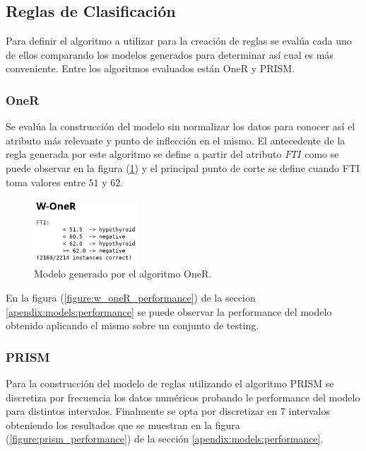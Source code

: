 \documentclass[osajnl,twocolumn,showpacs,superscriptaddress,10pt,floatfix]{revtex4-1} %
\begin{document}
\subsection{Reglas de Clasificación}

Para definir el algoritmo a utilizar para la creación de reglas se evalúa cada uno de ellos comparando los modelos generados para determinar así cual es más conveniente. Entre los algoritmos evaluados están OneR y PRISM. \\

\subsubsection{OneR}

Se evalúa la construcción del modelo sin normalizar los datos para conocer así el atributo más relevante y punto de inflección en el mismo. El antecedente de la regla generada por este algoritmo se define a partir del atributo $FTI$ como se puede observar en la figura (\ref{figure:w_oneR}) y el principal punto de corte se define cuando FTI toma valores entre $51$ y $62$. \\

\begin{figure}[H]
    \centering
    \includegraphics[width=0.35\textwidth]{models/w_oneR}
    \caption{Modelo generado por el algoritmo OneR.}
    \label{figure:w_oneR}
\end{figure}

En la figura (\ref{figure:w_oneR_performance}) de la seccion \ref{apendix:models:performance} se puede observar la performance del modelo obtenido aplicando el mismo sobre un conjunto de testing. \\

\subsubsection{PRISM}

Para la construcción del modelo de reglas utilizando el algoritmo PRISM se discretiza por frecuencia los datos numéricos probando le performance del modelo para distintos intervalos. Finalmente se opta por discretizar en 7 intervalos obteniendo los resultados que se muestran en la figura (\ref{figure:prism_performance}) de la sección \ref{apendix:models:performance}. \\
\end{document}
